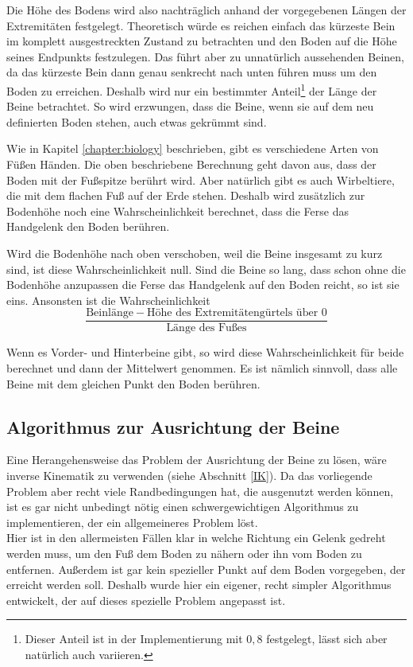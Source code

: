 Die Höhe des Bodens wird also nachträglich anhand der vorgegebenen Längen der Extremitäten festgelegt.
Theoretisch würde es reichen einfach das kürzeste Bein im komplett ausgestreckten Zustand zu betrachten und den Boden auf die Höhe seines Endpunkts festzulegen.
Das führt aber zu unnatürlich aussehenden Beinen, da das kürzeste Bein dann genau senkrecht nach unten führen muss um den Boden zu erreichen.
Deshalb wird nur ein bestimmter Anteil\footnote{Dieser Anteil ist in der Implementierung mit $0{,}8$ festgelegt, lässt sich aber natürlich auch variieren.} der Länge der Beine betrachtet. So wird erzwungen, dass die Beine, wenn sie auf dem neu definierten Boden stehen, auch etwas gekrümmt sind.

Wie in Kapitel \ref{chapter:biology} beschrieben, gibt es verschiedene Arten von Füßen \bzw Händen. Die oben beschriebene Berechnung geht davon aus, dass der Boden mit der Fußspitze berührt wird. Aber natürlich gibt es auch Wirbeltiere, die mit dem flachen Fuß auf der Erde stehen.
Deshalb wird zusätzlich zur Bodenhöhe noch eine Wahrscheinlichkeit berechnet, dass die Ferse \bzw das Handgelenk den Boden berühren.

Wird die Bodenhöhe nach oben verschoben, weil die Beine insgesamt zu kurz sind, ist diese Wahrscheinlichkeit null.
Sind die Beine so lang, dass schon ohne die Bodenhöhe anzupassen die Ferse \bzw das Handgelenk auf den Boden reicht, so ist sie eins.
Ansonsten ist die Wahrscheinlichkeit 
\[\frac{\text{Beinlänge} - \text{Höhe des Extremitätengürtels über }0}{\text{Länge des Fußes}}\]

Wenn es Vorder- und Hinterbeine gibt, so wird diese Wahrscheinlichkeit für beide berechnet und dann der Mittelwert genommen. Es ist nämlich sinnvoll, dass alle Beine mit dem gleichen Punkt den Boden berühren.


\subsection{Algorithmus zur Ausrichtung der Beine}
\label{leg_algo}

Eine Herangehensweise das Problem der Ausrichtung der Beine zu lösen, wäre inverse Kinematik zu verwenden (siehe Abschnitt \ref{IK}). 
Da das vorliegende Problem aber recht viele Randbedingungen hat, die ausgenutzt werden können, ist es gar nicht unbedingt nötig einen schwergewichtigen Algorithmus zu implementieren, der ein allgemeineres Problem löst.\\
Hier ist \zb in den allermeisten Fällen klar in welche Richtung ein Gelenk gedreht werden muss, um den Fuß dem Boden zu nähern oder ihn vom Boden zu entfernen. Außerdem ist gar kein spezieller Punkt auf dem Boden vorgegeben, der erreicht werden soll.
Deshalb wurde hier ein eigener, recht simpler Algorithmus entwickelt, der auf dieses spezielle Problem angepasst ist.

